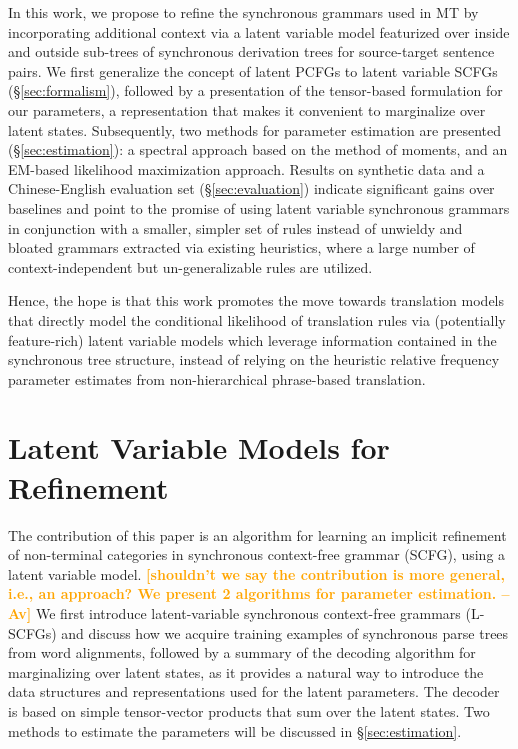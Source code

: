 \documentclass[11pt]{article}
\newcommand{\avcomment}[1]{\textcolor{orange}{\textbf{[#1 -- Av]}}}
\begin{document}
In this work, we propose to refine the synchronous grammars used in MT by incorporating additional context via a latent variable model featurized over inside and outside sub-trees of synchronous derivation trees for source-target sentence pairs.  
We first generalize the concept of latent PCFGs to latent variable SCFGs (\S\ref{sec:formalism}), followed by a presentation of the tensor-based formulation for our parameters, a representation that makes it convenient to marginalize over latent states.  
Subsequently, two methods for parameter estimation are presented (\S\ref{sec:estimation}): a spectral approach based on the method of moments, and an EM-based likelihood maximization approach.  
Results on synthetic data and a Chinese-English evaluation set (\S\ref{sec:evaluation}) indicate significant gains over baselines and point to the promise of using latent variable synchronous grammars in conjunction with a smaller, simpler set of rules instead of unwieldy and bloated grammars extracted via existing heuristics, where a large number of context-independent but un-generalizable rules are utilized.  

Hence, the hope is that this work promotes the move towards translation models that directly model the conditional likelihood of translation rules via (potentially feature-rich) latent variable models which leverage information contained in the synchronous tree structure, instead of relying on the heuristic relative frequency parameter estimates \cite{Koehn2003} from non-hierarchical phrase-based translation.  

\section{Latent Variable Models for Refinement}
The contribution of this paper is an algorithm for learning an implicit refinement of non-terminal categories in synchronous context-free grammar (SCFG), using a latent variable model.  
\avcomment{shouldn't we say the contribution is more general, i.e., an approach? We present 2 algorithms for parameter estimation.}
We first introduce latent-variable synchronous context-free grammars (L-SCFGs) and discuss how we acquire training examples of synchronous parse trees from word alignments, followed by a summary of the decoding algorithm for marginalizing over latent states, as it provides a natural way to introduce the data structures and representations used for the latent parameters.  
The decoder is based on simple tensor-vector products that sum over the latent states.  
Two methods to estimate the parameters will be discussed in \S\ref{sec:estimation}. 
\end{document}
